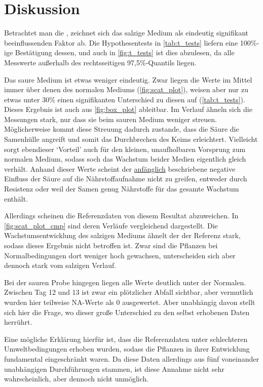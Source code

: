 \section{Diskussion} %
    \label{sec:diskussion}
    Betrachtet man die , zeichnet sich das salzige Medium als eindeutig signifikant beeinflussenden Faktor ab. Die Hypothesentests in \autoref{tab:t_tests} liefern eine 100\%-ige Bestätigung dessen, und auch in \autoref{fig:t_tests} ist dies abzulesen, da alle Messwerte außerhalb des rechtsseitigen 97,5\%-Quantils liegen.

    Das saure Medium ist etwas weniger eindeutig. Zwar liegen die Werte im Mittel immer über denen des normalen Mediums (\autoref{fig:scat_plot}), weisen aber nur zu etwas unter 30\% einen signifikanten Unterschied zu diesen auf (\autoref{tab:t_tests}). Dieses Ergebnis ist auch aus \autoref{fig:box_plot} ableitbar. Im Verlauf ähneln sich die Messungen stark, nur dass sie beim sauren Medium weniger streuen. Möglicherweise kommt diese Streuung dadurch zustande, dass die Säure die Samenhülle angreift und somit das Durchbrechen des Keims erleichtert. Vielleicht sorgt ebendieser `Vorteil' auch für den kleinen, unaufholbaren Vorsprung zum normalen Medium, sodass soch das Wachstum beider Medien eigentlich gleich verhält. Anhand dieser Werte scheint der \hyperref[sec:einleitung]{anfänglich} beschriebene negative Einfluss der Säure auf die Nährstoffaufnahme nicht zu greifen, entweder durch Resistenz oder weil der Samen genug Nährstoffe für das gesamte Wachstum enthält.

    Allerdings scheinen die Referenzdaten von diesem Resultat abzuweichen. In \autoref{fig:scat_plot_cmp} sind deren Verläufe vergleichend dargestellt. Die Wachstumsentwicklung des salzigen Mediums ähnelt der der Referenz stark, sodass dieses Ergebnis nicht betroffen ist. Zwar sind die Pflanzen bei Normalbedingungen dort weniger hoch gewachsen, unterscheiden sich aber dennoch stark vom salzigen Verlauf.

    Bei der sauren Probe hingegen liegen alle Werte deutlich unter der Normalen. Zwischen Tag 12 und 13 ist zwar ein plötzlicher Abfall sichtbar, aber vermutlich wurden hier teilweise NA-Werte als 0 ausgewertet. Aber unabhängig davon stellt sich hier die Frage, wo dieser große Unterschied zu den selbst erhobenen Daten herrührt.

    Eine mögliche Erklärung hierfür ist, dass die Referenzdaten unter schlechteren Umweltbedingungen erhoben wurden, sodass die Pflanzen in ihrer Entwicklung fundamental eingeschränkt waren. Da diese Daten allerdings aus fünf voneinander unabhängigen Durchführungen stammen, ist diese Annahme nicht sehr wahrscheinlich, aber dennoch nicht unmöglich.

